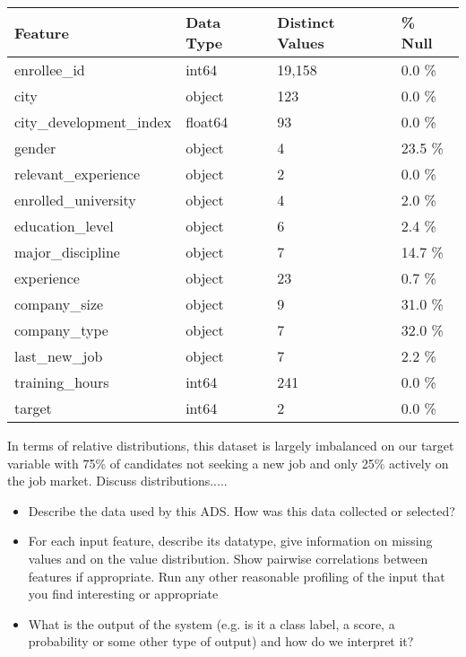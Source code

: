 \documentclass[11pt]{article}
\begin{document}
\begin{table}[h]
\centering
\begin{tabular}{ |p{4cm}||p{2cm}| p{2.53cm}| p{1.5cm}|}
 \hline
 Feature 		& Data Type	& Distinct Values	& \% Null\\
 \hline
enrollee\_id 	& int64 & 19,158 & 0.0 \%	\\
city			 & object & 123 & 0.0 \% \\
city\_development\_index & float64 & 93 & 0.0 \% \\
gender		& object & 4 & 23.5 \% \\
relevant\_experience & object & 2 & 0.0 \%\\

enrolled\_university & object & 4 & 2.0 \% \\

education\_level & object & 6 & 2.4 \% \\

major\_discipline  & object & 7 & 14.7 \% \\

experience  	& object & 23 & 0.7 \% \\

company\_size 	& object & 9 & 31.0 \% \\

company\_type 	& object & 7 & 32.0 \%\\

last\_new\_job 	& object & 7 & 2.2 \%\\

training\_hours & int64 & 241 & 0.0 \%  \\

target 		 & int64 & 2 & 0.0 \% \\
 \hline
\end{tabular}
\end{table}


In terms of relative distributions, this dataset is largely imbalanced on our target variable with 75\% of candidates not seeking a new job and only 25\% actively on the job market.  Discuss distributions.....



\begin{itemize}
	\item Describe the data used by this ADS.  How was this data collected or selected?
	\item For each input feature, describe its datatype, give information on missing values and on the value distribution. Show pairwise correlations between features if appropriate.  Run any other reasonable profiling of the input that you find interesting or appropriate
	\item What is the output of the system (e.g. is it a class label, a score, a probability or some other type of output) and how do we interpret it?
\end{itemize}
\end{document}
